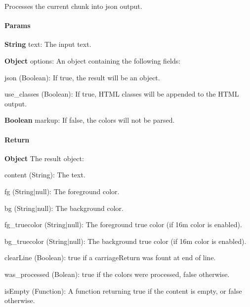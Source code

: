 Processes the current chunk into json output. \paragraph*{Params}


\begin{DoxyItemize}
\item {\bfseries String} {\ttfamily text}\+: The input text.
\item {\bfseries Object} {\ttfamily options}\+: An object containing the following fields\+:
\begin{DoxyItemize}
\item {\ttfamily json} (Boolean)\+: If {\ttfamily true}, the result will be an object.
\item {\ttfamily use\+\_\+classes} (Boolean)\+: If {\ttfamily true}, H\+T\+ML classes will be appended to the H\+T\+ML output.
\end{DoxyItemize}
\item {\bfseries Boolean} {\ttfamily markup}\+: If false, the colors will not be parsed.
\end{DoxyItemize}

\paragraph*{Return}


\begin{DoxyItemize}
\item {\bfseries Object} The result object\+:
\begin{DoxyItemize}
\item {\ttfamily content} (String)\+: The text.
\item {\ttfamily fg} (String$\vert$null)\+: The foreground color.
\item {\ttfamily bg} (String$\vert$null)\+: The background color.
\item {\ttfamily fg\+\_\+truecolor} (String$\vert$null)\+: The foreground true color (if 16m color is enabled).
\item {\ttfamily bg\+\_\+truecolor} (String$\vert$null)\+: The background true color (if 16m color is enabled).
\item {\ttfamily clear\+Line} (Boolean)\+: {\ttfamily true} if a carriage\+Return  was fount at end of line.
\item {\ttfamily was\+\_\+processed} (Bolean)\+: {\ttfamily true} if the colors were processed, {\ttfamily false} otherwise.
\item {\ttfamily is\+Empty} (Function)\+: A function returning {\ttfamily true} if the content is empty, or {\ttfamily false} otherwise.
\end{DoxyItemize}
\end{DoxyItemize}

